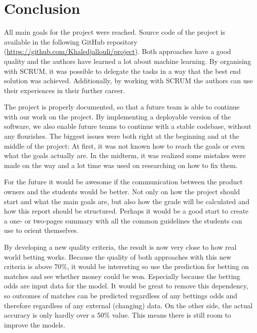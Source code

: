 
\chapter{Conclusion}
\label{chap:conclusion}
All main goals for the project were reached. Source code of the project is available in the following GitHub repository (\url{https://github.com/Khaledjallouli/project}). Both approaches have a good quality and the authors have learned a lot about machine learning. By organising with SCRUM, it was possible to delegate the tasks in a way that the best end solution was achieved. Additionally, by working with SCRUM the authors can use their experiences in their further career.

The project is properly documented, so that a future team is able to continue with our work on the project. By implementing a deployable version of the software, we also enable future teams to continue with a stable codebase, without any flourishes. The biggest issues were both right at the beginning and at the middle of the project: At first, it was not known how to reach the goals or even what the goals actually are. In the midterm, it was realized some mistakes were made on the way and a lot time was used on researching on how to fix them.

For the future it would be awesome if the communication between the product owners and the students would be better. Not only on how the project should start and what the main goals are, but also how the grade will be calculated and how this report should be structured. Perhaps it would be a good start to create a one- or two-pages summary with all the common guidelines the students can use to orient themselves.

By developing a new quality criteria, the result is now very close to how real world betting works. Because the quality of both approaches with this new criteria is above 70\%, it would be interesting so use the prediction for betting on matches and see whether money could be won. Especially because the betting odds are input data for the model. It would be great to remove this dependency, so outcomes of matches can be predicted regardless of any bettings odds and therefore regardless of any external (changing) data.
On the other side, the actual accuracy is only hardly over a 50\% value. This means there is still room to improve the models.
